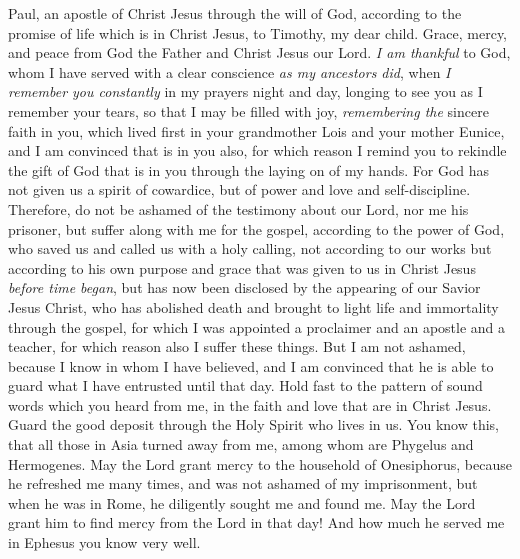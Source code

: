 
\begin{biblechapter} %
 Paul, an apostle of Christ Jesus through the will of God, according to the promise of life which is in Christ Jesus,
\verse to Timothy, my dear child. Grace, mercy, and peace from God the Father and Christ Jesus our Lord.
 \textit{I am thankful} to God, whom I have served with a clear conscience \textit{as my ancestors did}, when \textit{I remember you constantly} in my prayers night and day,
\verse longing to see you as I remember your tears, so that I may be filled with joy,
\verse \textit{remembering the} sincere faith in you, which lived first in your grandmother Lois and your mother Eunice, and I am convinced that is in you also,
\verse for which reason I remind you to rekindle the gift of God that is in you through the laying on of my hands.
\verse For God has not given us a spirit of cowardice, but of power and love and self-discipline.
 Therefore, do not be ashamed of the testimony about our Lord, nor me his prisoner, but suffer along with me for the gospel, according to the power of God,
\verse who saved us and called us with a holy calling, not according to our works but according to his own purpose and grace that was given to us in Christ Jesus \textit{before time began},
\verse but has now been disclosed by the appearing of our Savior Jesus Christ, who has abolished death and brought to light life and immortality through the gospel,
\verse for which I was appointed a proclaimer and an apostle and a teacher,
\verse for which reason also I suffer these things. But I am not ashamed, because I know in whom I have believed, and I am convinced that he is able to guard what I have entrusted until that day.
\verse Hold fast to the pattern of sound words which you heard from me, in the faith and love that are in Christ Jesus.
\verse Guard the good deposit through the Holy Spirit who lives in us.
\verse You know this, that all those in Asia turned away from me, among whom are Phygelus and Hermogenes.
\verse May the Lord grant mercy to the household of Onesiphorus, because he refreshed me many times, and was not ashamed of my imprisonment,
\verse but when he was in Rome, he diligently sought me and found me.
\verse May the Lord grant him to find mercy from the Lord in that day! And how much he served me in Ephesus you know very well.
\end{biblechapter}

